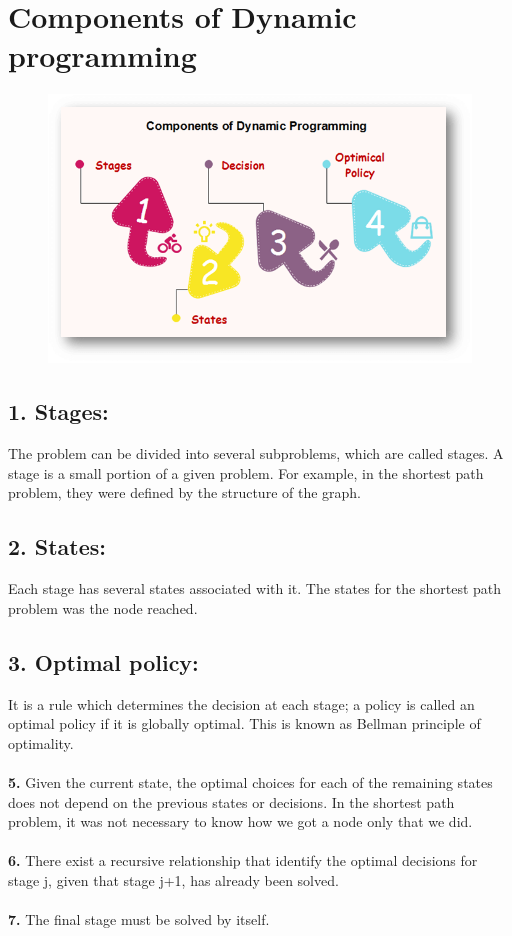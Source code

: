 \documentclass[11pt]{article}
\begin{document}
\section*{Components of Dynamic programming\\}
\begin{figure}
\includegraphics[width=.8\textwidth]{3.png}
\end{figure}
\subsection*{1. Stages:}
The problem can be divided into several subproblems, which are called stages. A stage is a small portion of a given problem. For example, in the shortest path problem, they were defined by the structure of the graph.\\
\subsection*{2. States:}
Each stage has several states associated with it. The states for the shortest path problem was the node reached.\\
\subsection*{3. Optimal policy:}
It is a rule which determines the decision at each stage; a policy is called an optimal policy if it is globally optimal. This is known as Bellman principle of optimality.\\\\
\textbf{5.} Given the current state, the optimal choices for each of the remaining states does not depend on the previous states or decisions. In the shortest path problem, it was not necessary to know how we got a node only that we did.\\\\
\textbf{6.} There exist a recursive relationship that identify the optimal decisions for stage j, given that stage j+1, has already been solved.\\\\
\textbf{7.} The final stage must be solved by itself.\\
\end{document}
